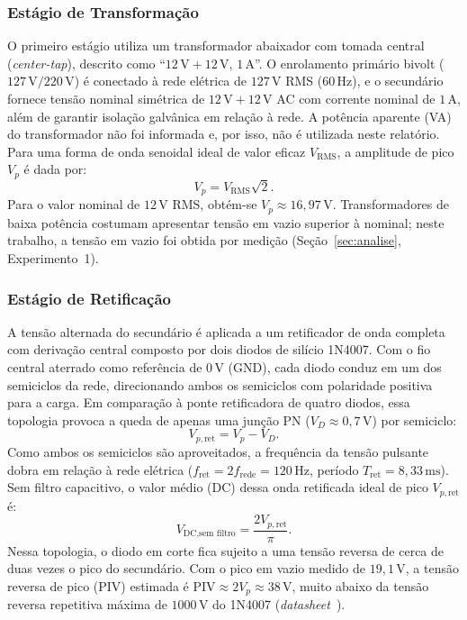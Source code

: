 \subsubsection{Estágio de Transformação}
O primeiro estágio utiliza um transformador abaixador com tomada central (\textit{center-tap}), descrito como ``$12\,\text{V}+12\,\text{V}$, $1\,\text{A}$''. O enrolamento primário bivolt ($127\,\text{V}/220\,\text{V}$) é conectado à rede elétrica de $127\,\text{V}$ RMS ($60\,\text{Hz}$), e o secundário fornece tensão nominal simétrica de $12\,\text{V} + 12\,\text{V}$ AC com corrente nominal de $1\,\text{A}$, além de garantir isolação galvânica em relação à rede. A potência aparente (VA) do transformador não foi informada e, por isso, não é utilizada neste relatório. Para uma forma de onda senoidal ideal de valor eficaz $V_{\text{RMS}}$, a amplitude de pico $V_p$ é dada por:
\begin{equation}
V_p = V_{\text{RMS}}\sqrt{2}.
\label{eq:vpico}
\end{equation}
Para o valor nominal de $12\,\text{V}$ RMS, obtém-se $V_p \approx 16{,}97\,\text{V}$. Transformadores de baixa potência costumam apresentar tensão em vazio superior à nominal; neste trabalho, a tensão em vazio foi obtida por medição (Seção~\ref{sec:analise}, Experimento~1).

\subsubsection{Estágio de Retificação}
A tensão alternada do secundário é aplicada a um retificador de onda completa com derivação central composto por dois diodos de silício 1N4007. Com o fio central aterrado como referência de $0\,\text{V}$ (GND), cada diodo conduz em um dos semiciclos da rede, direcionando ambos os semiciclos com polaridade positiva para a carga. Em comparação à ponte retificadora de quatro diodos, essa topologia provoca a queda de apenas uma junção PN ($V_D \approx 0{,}7\,\text{V}$) por semiciclo:
\begin{equation}
V_{p,\text{ret}} = V_p - V_D.
\label{eq:vpret}
\end{equation}
Como ambos os semiciclos são aproveitados, a frequência da tensão pulsante dobra em relação à rede elétrica ($f_{\text{ret}} = 2f_{\text{rede}} = 120\,\text{Hz}$, período $T_{\text{ret}} = 8{,}33\,\text{ms}$). Sem filtro capacitivo, o valor médio (DC) dessa onda retificada ideal de pico $V_{p,\text{ret}}$ é:
\begin{equation}
V_{\text{DC,sem filtro}} = \frac{2 V_{p,\text{ret}}}{\pi}.
\label{eq:vdc_sem_filtro}
\end{equation}
Nessa topologia, o diodo em corte fica sujeito a uma tensão reversa de cerca de duas vezes o pico do secundário. Com o pico em vazio medido de $19{,}1\,\text{V}$, a tensão reversa de pico (PIV) estimada é $\text{PIV} \approx 2V_p \approx 38\,\text{V}$, muito abaixo da tensão reversa repetitiva máxima de $1000\,\text{V}$ do 1N4007 (\textit{datasheet}~\cite{ds_1n4007}).

